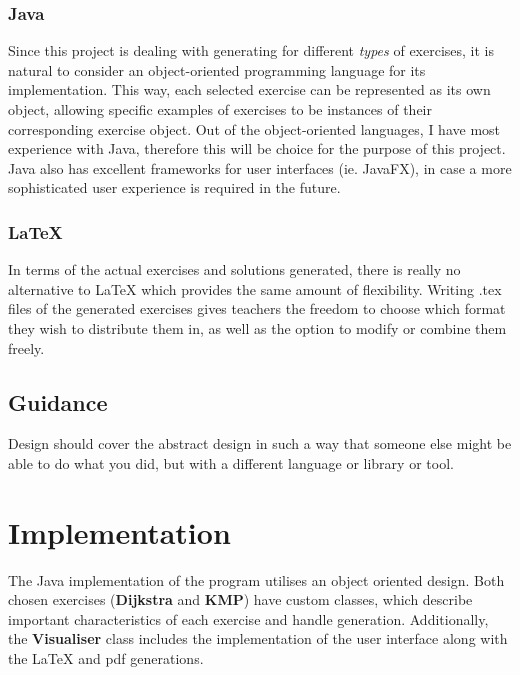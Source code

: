 \documentclass{l4proj}
\begin{document}
\subsection{Java}

Since this project is dealing with generating for different \emph{types} of exercises, it is natural to consider an object-oriented programming language for its implementation. This way, each selected exercise can be represented as its own object, allowing specific examples of exercises to be instances of their corresponding exercise object. Out of the object-oriented languages, I have most experience with Java, therefore this will be choice for the purpose of this project. Java also has excellent frameworks for user interfaces (ie. JavaFX), in case a more sophisticated user experience is required in the future.

\subsection{LaTeX}

In terms of the actual exercises and solutions generated, there is really no alternative to LaTeX which provides the same amount of flexibility. Writing .tex files of the generated exercises gives teachers the freedom to choose which format they wish to distribute them in, as well as the option to modify or combine them freely.

\section{Guidance}
Design should cover the abstract design in such a way that someone else might be able to do what you did, but with a different language or library or tool.

\chapter{Implementation}
\label{chap:imp}

The Java implementation of the program utilises an object oriented design. Both chosen exercises (\textbf{Dijkstra} and \textbf{KMP}) have custom classes, which describe important characteristics of each exercise and handle generation. Additionally, the \textbf{Visualiser} class includes the implementation of the user interface along with the LaTeX and pdf generations.
\end{document}
